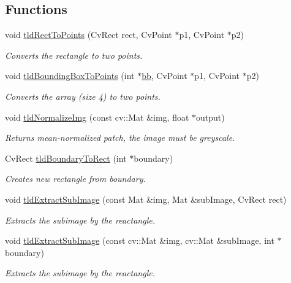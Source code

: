 \subsection*{Functions}
\begin{DoxyCompactItemize}
\item 
void \hyperlink{namespacetld_ac0c16951370c978dee562ac3d3bd1554}{tld\-Rect\-To\-Points} (Cv\-Rect rect, Cv\-Point $\ast$p1, Cv\-Point $\ast$p2)
\begin{DoxyCompactList}\small\item\em Converts the rectangle to two points. \end{DoxyCompactList}\item 
void \hyperlink{namespacetld_a0c77964d9fc8756d176352372745a0ff}{tld\-Bounding\-Box\-To\-Points} (int $\ast$\hyperlink{namespacetld_aa5e13bbb9a53d3e9103d430b6113b08b}{bb}, Cv\-Point $\ast$p1, Cv\-Point $\ast$p2)
\begin{DoxyCompactList}\small\item\em Converts the array (size 4) to two points. \end{DoxyCompactList}\item 
void \hyperlink{namespacetld_a7facbe495da1f0e058c78b9b7dea412a}{tld\-Normalize\-Img} (const cv\-::\-Mat \&img, float $\ast$output)
\begin{DoxyCompactList}\small\item\em Returns mean-\/normalized patch, the image must be greyscale. \end{DoxyCompactList}\item 
Cv\-Rect \hyperlink{namespacetld_afd43d8a27c419d1f5da8718be917d4b5}{tld\-Boundary\-To\-Rect} (int $\ast$boundary)
\begin{DoxyCompactList}\small\item\em Creates new rectangle from boundary. \end{DoxyCompactList}\item 
void \hyperlink{namespacetld_a200bdf631ed45b6d0875996d2e4709f2}{tld\-Extract\-Sub\-Image} (const Mat \&img, Mat \&sub\-Image, Cv\-Rect rect)
\begin{DoxyCompactList}\small\item\em Extracts the subimage by the reactangle. \end{DoxyCompactList}\item 
void \hyperlink{namespacetld_a16fe2b016494fa66be611f723ed7bebc}{tld\-Extract\-Sub\-Image} (const cv\-::\-Mat \&img, cv\-::\-Mat \&sub\-Image, int $\ast$boundary)
\begin{DoxyCompactList}\small\item\em Extracts the subimage by the reactangle. \end{DoxyCompactList}\item 

\end{DoxyCompactItemize}
